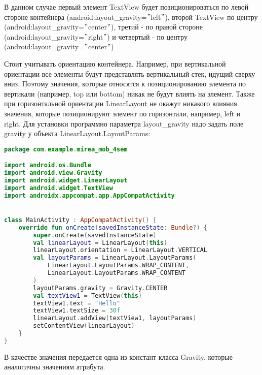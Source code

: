 В данном случае первый элемент TextView будет позиционироваться по
левой стороне контейнера (android:layout\_gravity=\("\)left\("\)), второй TextView по
центру (android:layout\_gravity=\("\)center\("\)), третий - по правой стороне
(android:layout\_gravity=\("\)right\("\)) и четвертый - по центру
(android:layout\_gravity=\("\)center\("\))

Стоит учитывать ориентацию контейнера.
Например, при вертикальной
ориентации все элементы будут представлять вертикальный стек, идущий
сверху вниз.
Поэтому значения, которые относятся к позиционированию
элемента по вертикали (например, top или bottom) никак не будут влиять на
элемент.
Также при горизонтальной ориентации LinearLayout не окажут
никакого влияния значения, которые позиционируют элемент по
горизонтали, например, left и right.
Для установки программно параметра layout\_gravity надо задать поле
gravity у объекта LinearLayout.LayoutParams:
\begin{lstlisting}[language=Kotlin, caption=\leftline{Kotlin}, label=lst:Layoutgravity1]
package com.example.mirea_mob_4sem

import android.os.Bundle
import android.view.Gravity
import android.widget.LinearLayout
import android.widget.TextView
import androidx.appcompat.app.AppCompatActivity


class MainActivity : AppCompatActivity() {
    override fun onCreate(savedInstanceState: Bundle?) {
        super.onCreate(savedInstanceState)
        val linearLayout = LinearLayout(this)
        linearLayout.orientation = LinearLayout.VERTICAL
        val layoutParams = LinearLayout.LayoutParams(
            LinearLayout.LayoutParams.WRAP_CONTENT,
            LinearLayout.LayoutParams.WRAP_CONTENT
        )
        layoutParams.gravity = Gravity.CENTER
        val textView1 = TextView(this)
        textView1.text = "Hello"
        textView1.textSize = 30f
        linearLayout.addView(textView1, layoutParams)
        setContentView(linearLayout)
    }
}
\end{lstlisting}
В качестве значения передается одна из констант класса Gravity, которые
аналогичны значениям атрибута.

